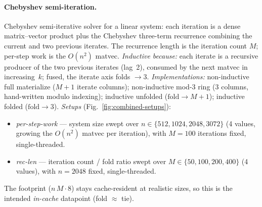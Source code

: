 \paragraph{Chebyshev semi-iteration.}
Chebyshev semi-iterative solver for a linear system: each iteration is a dense
matrix--vector product plus the Chebyshev three-term recurrence combining the
current and two previous iterates. The recurrence length is the iteration count
$M$; per-step work is the $O(n^2)$ matvec.
\emph{Inductive because:} each iterate is a recursive producer of the two previous
iterates (lag~2), consumed by the next matvec in increasing~$k$; fused, the iterate
axis folds $\to 3$.
\emph{Implementations:} non-inductive full materialize ($M{+}1$ iterate columns);
non-inductive mod-3 ring ($3$ columns, hand-written modulo indexing); inductive
unfolded ($\mathrm{fold}\!\to\!M{+}1$); inductive folded ($\mathrm{fold}\!\to\!3$).
\emph{Setups} (Fig.~\ref{fig:combined-setups}):
\begin{itemize}\itemsep2pt
  \item \textit{per-step-work} --- system size swept over
    $n\in\{512,1024,2048,3072\}$ (4 values, growing the $O(n^2)$ matvec per
    iteration), with $M{=}100$ iterations fixed, single-threaded.
  \item \textit{rec-len} --- iteration count / fold ratio swept over
    $M\in\{50,100,200,400\}$ (4 values), with $n{=}2048$ fixed, single-threaded.
\end{itemize}
The footprint ($n\,M\cdot 8$) stays cache-resident at realistic sizes, so this is
the intended \emph{in-cache} datapoint (fold $\approx$ tie).

